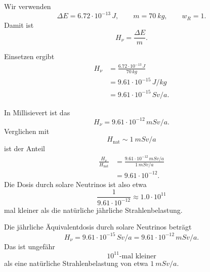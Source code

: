 \documentclass[11pt,a4paper]{scrartcl}
\begin{document}
\begin{enumerate}[label=(\alph*)]
            \begin{calculationbox}
                Wir verwenden
                \[
                    \Delta E=6.72\cdot10^{-13}\,\si{J},
                    \qquad
                    m=\SI{70}{kg},
                    \qquad
                    w_R=1.
                \]
                Damit ist
                \[
                    H_\nu=\frac{\Delta E}{m}.
                \]

                \begin{calculationbox}
                    Einsetzen ergibt
                    \begin{align*}
                        H_\nu
                        &=\frac{6.72\cdot10^{-13}\,\si{J}}{70\,\si{kg}}\\
                        &=9.61\cdot10^{-15}\,\si{J/kg}\\
                        &=9.61\cdot10^{-15}\,\si{Sv/a}.
                    \end{align*}
                \end{calculationbox}

                \begin{calculationbox}
                    In Millisievert ist das
                    \[
                        H_\nu=9.61\cdot10^{-12}\,\si{mSv/a}.
                    \]
                    Verglichen mit
                    \[
                        H_{\mathrm{nat}}\sim\SI{1}{mSv/a}
                    \]
                    ist der Anteil
                    \begin{align*}
                        \frac{H_\nu}{H_{\mathrm{nat}}}
                        &=\frac{9.61\cdot10^{-12}\,\si{mSv/a}}{1\,\si{mSv/a}}\\
                        &=9.61\cdot10^{-12}.
                    \end{align*}
                    Die Dosis durch solare Neutrinos ist also etwa
                    \[
                        \frac{1}{9.61\cdot10^{-12}}\approx1.0\cdot10^{11}
                    \]
                    mal kleiner als die natürliche jährliche Strahlenbelastung.
                \end{calculationbox}
            \end{calculationbox}

            \begin{answerbox}
                Die jährliche Äquivalentdosis durch solare Neutrinos beträgt
                \[
                    \boxed{H_\nu=9.61\cdot10^{-15}\,\si{Sv/a}
                    =9.61\cdot10^{-12}\,\si{mSv/a}.}
                \]
                Das ist ungefähr
                \[
                    \boxed{10^{11}\text{-mal kleiner}}
                \]
                als eine natürliche Strahlenbelastung von etwa \(\SI{1}{mSv/a}\).
            \end{answerbox}
    \end{enumerate}
\end{document}
